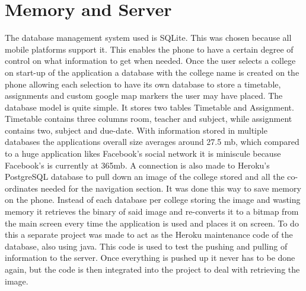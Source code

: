 \section{Memory and Server}
The database management system used is SQLite. This was chosen because all mobile platforms support it. This enables the phone to have a certain degree of control on what information to get when needed. Once the user selects a college on start-up of the application a database with the college name is created on the phone allowing each selection to have its own database to store a timetable, assignments and custom google map markers the user may have placed. The database model is quite simple. It stores two tables Timetable and Assignment. Timetable contains three columns room, teacher and subject, while assignment contains two, subject and due-date. With information stored in multiple databases the applications overall size averages around 27.5 mb, which compared to a huge application likes Facebook's social network it is miniscule because Facebook's is currently at 365mb. 
A connection is also made to Heroku's PostgreSQL database to pull down an image of the college stored and all the co-ordinates needed for the navigation section. It was done this way to save memory on the phone. Instead of each database per college storing the image and wasting memory it retrieves the binary of said image and re-converts it to a bitmap from the main screen every time the application is used and places it on screen. To do this a separate project was made to act as the Heroku maintenance code of the database, also using java. This code is used to test the pushing and pulling of information to the server. Once everything is pushed up it never has to be done again, but the code is then integrated into the project to deal with retrieving the image.

